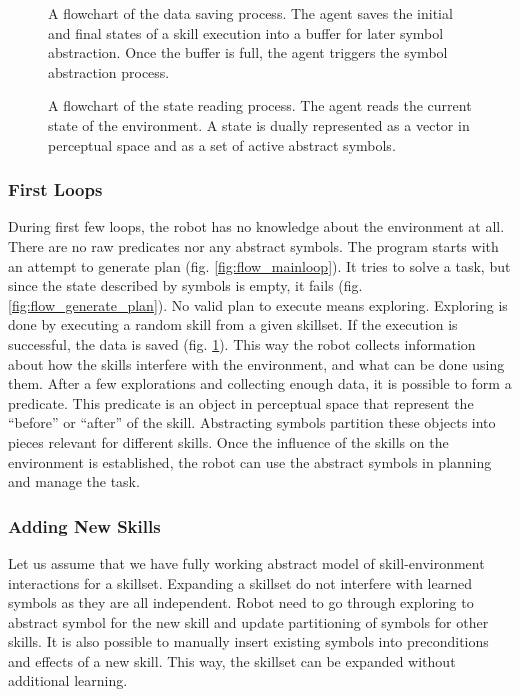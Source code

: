 \begin{figure}[htbp]
    \centering
    {
        
    }
    \caption{A flowchart of the data saving process. The agent saves the initial and final states of a skill execution into a buffer for later symbol abstraction. Once the buffer is full, the agent triggers the symbol abstraction process.} 
    \label{fig:flow_save2buffer}
\end{figure}

\begin{figure}[htbp]
    \centering
    {
        
    }
    \caption{A flowchart of the state reading process. The agent reads the current state of the environment. A state is dually represented as a vector in perceptual space and as a set of active abstract symbols.} 
    \label{fig:flow_read_state}
\end{figure}

\subsubsection*{First Loops}
During first few loops, the robot has no knowledge about the environment at all. There are no raw predicates nor any abstract symbols. The program starts with an attempt to generate plan (fig. \ref{fig:flow_mainloop}). It tries to solve a task, but since the state described by symbols is empty, it fails (fig. \ref{fig:flow_generate_plan}). No valid plan to execute means exploring. Exploring is done by executing a random skill from a given skillset. If the execution is successful, the data is saved (fig. \ref{fig:flow_save2buffer}). This way the robot collects information about how the skills interfere with the environment, and what can be done using them. After a few explorations and collecting enough data, it is possible to form a predicate. This predicate is an object in perceptual space that represent the “before” or “after” of the skill. Abstracting symbols partition these objects into pieces relevant for different skills. Once the influence of the skills on the environment is established, the robot can use the abstract symbols in planning and manage the task.

\subsubsection*{Adding New Skills}
Let us assume that we have fully working abstract model of skill-environment interactions for a skillset. Expanding a skillset do not interfere with learned symbols as they are all independent. Robot need to go through exploring to abstract symbol for the new skill and update partitioning of symbols for other skills. It is also possible to manually insert existing symbols into preconditions and effects of a new skill. This way, the skillset can be expanded without additional learning.

